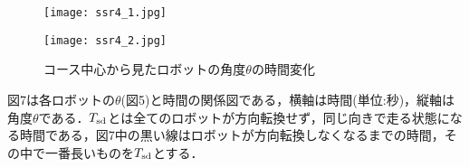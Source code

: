 
\vspace{-8mm}
\begin{figure}[!ht]
     \centering
     \texttt{[image: ssr4\_1.jpg]}
\end{figure}

\vspace{-8mm}
\begin{figure}[!ht]
     \centering
     \texttt{[image: ssr4\_2.jpg]}
     \caption{コース中心から見たロボットの角度$\theta$の時間変化}
\end{figure}

図7は各ロボットの$\theta$(図5)と時間の関係図である，横軸は時間(単位:$秒$)，縦軸は角度$\theta$である．$T_{\rm sd}$とは全てのロボットが方向転換せず，同じ向きで走る状態になる時間である，図7中の黒い線はロボットが方向転換しなくなるまでの時間，その中で一番長いものを$T_{\rm sd}$とする．




